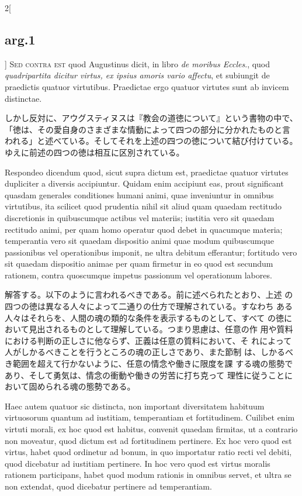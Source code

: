 \documentclass[paper=a4paper,fontsize=10pt,jafontsize=9pt,titlepage]{jlreq}
\begin{document}
\begin{paracol}{2}[\subsection{arg.1}]
{\scshape Sed contra est} quod Augustinus dicit, in libro {\itshape de
moribus Eccles}., quod {\itshape quadripartita dicitur virtus, ex
ipsius amoris vario affectu}, et subiungit de praedictis quatuor
virtutibus. Praedictae ergo quatuor virtutes sunt ab invicem
distinctae.

\switchcolumn

しかし反対に、アウグスティヌスは『教会の道徳について』という書物の中で、
「徳は、その愛自身のさまざまな情動によって四つの部分に分かれたものと言
われる」と述べている。そしてそれを上述の四つの徳について結び付けている。
ゆえに前述の四つの徳は相互に区別されている。


Respondeo dicendum quod, sicut supra dictum est, praedictae quatuor
 virtutes dupliciter a diversis accipiuntur. Quidam enim accipiunt
 eas, prout significant quasdam generales conditiones humani animi,
 quae inveniuntur in omnibus virtutibus, ita scilicet quod prudentia
 nihil sit aliud quam quaedam rectitudo discretionis in quibuscumque
 actibus vel materiis; iustitia vero sit quaedam rectitudo animi, per
 quam homo operatur quod debet in quacumque materia; temperantia vero
 sit quaedam dispositio animi quae modum quibuscumque passionibus vel
 operationibus imponit, ne ultra debitum efferantur; fortitudo vero
 sit quaedam dispositio animae per quam firmetur in eo quod est
 secundum rationem, contra quoscumque impetus passionum vel
 operationum labores.

\switchcolumn

解答する。以下のように言われるべきである。前に述べられたとおり、上述
 の四つの徳は異なる人々によって二通りの仕方で理解されている。すなわち
 ある人々はそれらを、人間の魂の類的な条件を表示するものとして、すべて
 の徳において見出されるものとして理解している。つまり思慮は、任意の作
 用や質料における判断の正しさに他ならず、正義は任意の質料において、そ
 れによって人がしかるべきことを行うところの魂の正しさであり、また節制
 は、しかるべき範囲を超えて行かないように、任意の情念や働きに限度を課
 する魂の態勢であり、そして勇気は、情念の衝動や働きの労苦に打ち克って
 理性に従うことにおいて固められる魂の態勢である。

\switchcolumn*

Haec autem quatuor sic distincta, non important diversitatem habituum
 virtuosorum quantum ad iustitiam, temperantiam et
 fortitudinem. Cuilibet enim virtuti morali, ex hoc quod est habitus,
 convenit quaedam firmitas, ut a contrario non moveatur, quod dictum
 est ad fortitudinem pertinere. Ex hoc vero quod est virtus, habet
 quod ordinetur ad bonum, in quo importatur ratio recti vel debiti,
 quod dicebatur ad iustitiam pertinere. In hoc vero quod est virtus
 moralis rationem participans, habet quod modum rationis in omnibus
 servet, et ultra se non extendat, quod dicebatur pertinere ad
 temperantiam.


\end{paracol}
\end{document}
